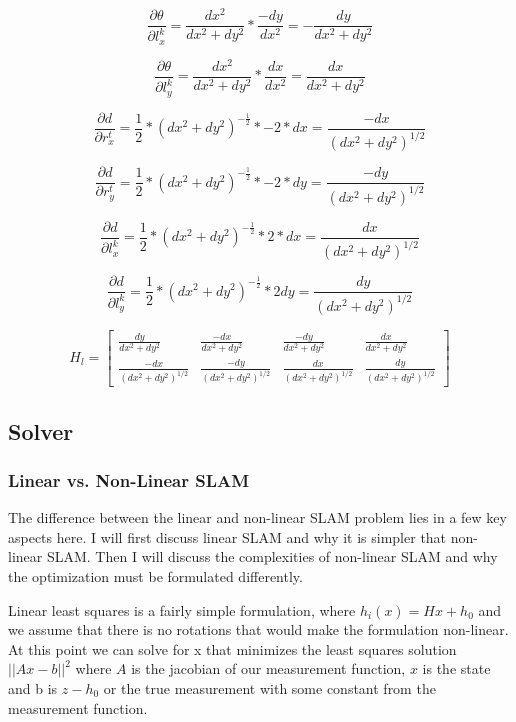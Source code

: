 \documentclass[12pt, a4paper]{article}
\begin{document}
$$\frac{\partial \theta}{\partial l_x^k} = \frac{dx^2}{dx^2 + dy^2} * \frac{-dy}{dx^2} = -\frac{dy}{dx^2 + dy^2}$$

$$\frac{\partial \theta}{\partial l_y^k} = \frac{dx^2}{dx^2 + dy^2} * \frac{dx}{dx^2} = \frac{dx}{dx^2 + dy^2}$$

$$\frac{\partial d}{\partial r_x^t} = \frac{1}{2} * (dx^2 + dy^2)^{-\frac{1}{2}} * -2 * dx = \frac{-dx}{(dx^2 + dy^2)^{1/2}}$$

$$\frac{\partial d}{\partial r_y^t} = \frac{1}{2} * (dx^2 + dy^2)^{-\frac{1}{2}} * -2 * dy = \frac{-dy}{(dx^2 + dy^2)^{1/2}}$$

$$\frac{\partial d}{\partial l_x^k} = \frac{1}{2} * (dx^2 + dy^2)^{-\frac{1}{2}} * 2 * dx = \frac{dx}{(dx^2 + dy^2)^{1/2}}$$

$$\frac{\partial d}{\partial l_y^k} = \frac{1}{2} * (dx^2 + dy^2)^{-\frac{1}{2}} * 2 dy = \frac{dy}{(dx^2 + dy^2)^{1/2}}$$


$$H_{l} = \begin{bmatrix}
    \frac{dy}{dx^2 + dy^2} & \frac{-dx}{dx^2 + dy^2} & \frac{-dy}{dx^2 + dy^2} & \frac{dx}{dx^2 + dy^2} \\
    \frac{-dx}{(dx^2 + dy^2)^{1/2}} & \frac{-dy}{(dx^2 + dy^2)^{1/2}}& \frac{dx}{(dx^2 + dy^2)^{1/2}} & \frac{dy}{(dx^2 + dy^2)^{1/2}}
\end{bmatrix}$$

\clearpage

\subsection{Solver}

\subsubsection{Linear vs. Non-Linear SLAM}
The difference between the linear and non-linear SLAM problem lies in a few key aspects here. I will first discuss linear SLAM and why it is simpler that non-linear SLAM. Then I will discuss the complexities of non-linear SLAM and why the optimization must be formulated differently. 

Linear least squares is a fairly simple formulation, where $h_i(x) = Hx + h_0$ and we assume that there is no rotations that would make the formulation non-linear. At this point we can solve for x that minimizes the least squares solution $||Ax - b||^2$ where $A$ is the jacobian of our measurement function, $x$ is the state and b is $z - h_0$ or the true measurement with some constant from the measurement function.
\end{document}
